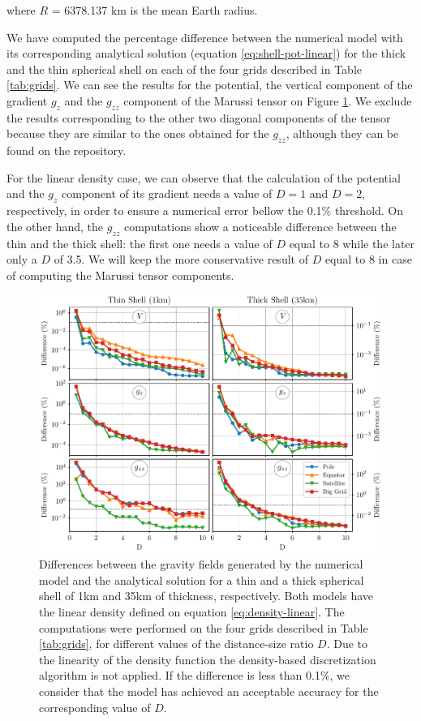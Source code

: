 \documentclass[extra]{gji}
\begin{document}
\noindent where $R$ = 6378.137 km is the mean Earth radius.

We have computed the percentage difference between the numerical model 
with its corresponding analytical solution (equation 
\ref{eq:shell-pot-linear}) for the thick and the thin spherical shell 
on each of the four grids described in Table \ref{tab:grids}.
We can see the results for the potential, the vertical component of the 
gradient $g_z$ and the $g_{zz}$ component of the Marussi tensor on 
Figure \ref{fig:D-linear}.
We exclude the results corresponding to the other two diagonal 
components of the tensor because they are similar to the ones obtained 
for the $g_{zz}$, although they can be found on the repository. 

For the linear density case, we can observe that the calculation of the 
potential and the $g_z$ component of its gradient needs a value of 
$D=1$ and $D=2$, respectively, in order to ensure a numerical error 
bellow the 0.1\% threshold.
On the other hand, the $g_{zz}$ computations show a noticeable 
difference between the thin and the thick shell: the first one needs a 
value of $D$ equal to 8 while the later only a $D$ of 3.5.
We will keep the more conservative result of $D$ equal to 8 in case of 
computing the Marussi tensor components.

\begin{figure}
\centering
\includegraphics[width=\linewidth]{figures/linear-D.pdf}
\caption{
    Differences between the gravity fields generated by the numerical model 
    and the analytical solution for a thin and a thick spherical shell of 1km 
    and 35km of thickness, respectively.
    Both models have the linear density defined on equation 
    \ref{eq:density-linear}.
    The computations were performed on the four grids described in 
    Table \ref{tab:grids}, for different values of the distance-size 
    ratio $D$.
    Due to the linearity of the density function the density-based 
    discretization algorithm is not applied.
    If the difference is less than 0.1\%, we consider that the model 
    has achieved an acceptable accuracy for the corresponding value of 
    $D$.
    }
\label{fig:D-linear}
\end{figure}
\end{document}
